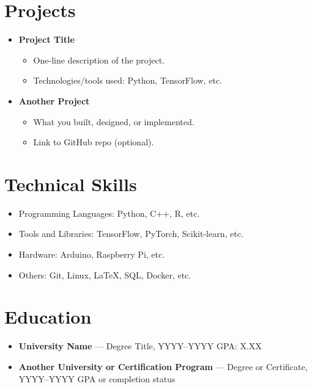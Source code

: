 \documentclass[a4paper,9pt]{article}
\begin{document}
\section*{Projects}
\begin{itemize}[leftmargin=0.15in]
    \item \textbf{Project Title}  
    \begin{itemize}
        \item One-line description of the project.
        \item Technologies/tools used: Python, TensorFlow, etc.
    \end{itemize}
    \item \textbf{Another Project}
    \begin{itemize}
        \item What you built, designed, or implemented.
        \item Link to GitHub repo (optional).
    \end{itemize}
\end{itemize}

\section*{Technical Skills}
\begin{itemize}[leftmargin=0.15in]
    \item Programming Languages: Python, C++, R, etc.
    \item Tools and Libraries: TensorFlow, PyTorch, Scikit-learn, etc.
    \item Hardware: Arduino, Raspberry Pi, etc.
    \item Others: Git, Linux, LaTeX, SQL, Docker, etc.
\end{itemize}

\section*{Education}
\begin{itemize}[leftmargin=0.15in]
    \item \textbf{University Name} — Degree Title, YYYY–YYYY  
    GPA: X.XX
    \item \textbf{Another University or Certification Program} — Degree or Certificate, YYYY–YYYY  
    GPA or completion status
\end{itemize}
\end{document}
